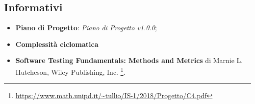 \subsection{Informativi}\label{rfinf}
\begin{itemize}
	\item \textbf{Piano di Progetto}: \textit{Piano di Progetto v1.0.0};
	\item \textbf{Complessità ciclomatica}
	\item \textbf{Software Testing Fundamentals: Methods and Metrics} di Marnie L. Hutcheson, Wiley Publishing, Inc.  
	\footnote{\url{https://www.math.unipd.it/~tullio/IS-1/2018/Progetto/C4.pdf}}.
	
	
\end{itemize}
